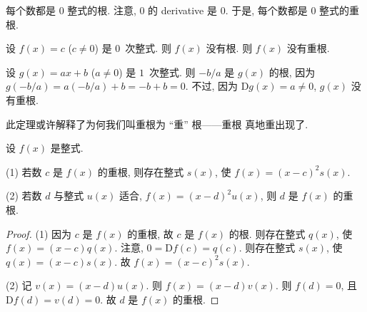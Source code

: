 \documentclass[../libro.tex]{subfiles}
\begin{document}
\begin{example}
    每个数都是 \(0\) 整式的根.
    注意, \(0\) 的 derivative 是 \(0\).
    于是, 每个数都是 \(0\) 整式的重根.

    设 \(f(x) = c\) (\(c \neq 0\)) 是 \(0\)~次整式.
    则 \(f(x)\) 没有根.
    则 \(f(x)\) 没有重根.

    设 \(g(x) = a x + b\) (\(a \neq 0\)) 是 \(1\)~次整式.
    则 \(-b/a\) 是 \(g(x)\) 的根,
    因为 \(g(-b/a) = a (-b/a) + b = -b + b = 0\).
    不过, 因为 \(\mathrm{D} g(x) = a \neq 0\),
    \(g(x)\) 没有重根.
\end{example}

此定理或许解释了为何我们叫重根为 ``重'' 根------重根%
真地重出现了.

\begin{theorem}
    设 \(f(x)\) 是整式.

    (1)
    若数 \(c\) 是 \(f(x)\) 的重根,
    则存在整式 \(s(x)\),
    使 \(f(x) = (x - c)^2 s(x)\).

    (2)
    若数 \(d\) 与整式 \(u(x)\) 适合,
    \(f(x) = (x - d)^2 u(x)\),
    则 \(d\) 是 \(f(x)\) 的重根.
\end{theorem}

\begin{proof}
    (1)
    因为 \(c\) 是 \(f(x)\) 的重根,
    故 \(c\) 是 \(f(x)\) 的根.
    则存在整式 \(q(x)\), 使 \(f(x) = (x - c) q(x)\).
    注意, \(0 = \mathrm{D} f(c) = q(c)\).
    则存在整式 \(s(x)\), 使 \(q(x) = (x - c) s(x)\).
    故 \(f(x) = (x - c)^2 s(x)\).

    (2)
    记 \(v(x) = (x - d) u(x)\).
    则 \(f(x) = (x - d) v(x)\).
    则 \(f(d) = 0\),
    且 \(\mathrm{D} f(d) = v(d) = 0\).
    故 \(d\) 是 \(f(x)\) 的重根.
\end{proof}
\end{document}
